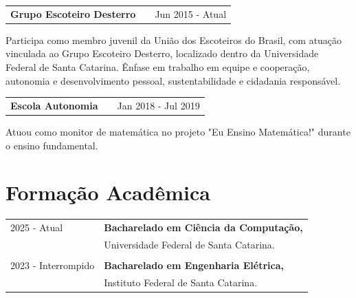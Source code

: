 \documentclass[a4paper,12pt]{article}
\makeatletter
\newenvironment{jobshort}[2]
    {
    \begin{tabularx}{\linewidth}{@{}l X r@{}}
    \textbf{#1} & \hfill &  #2 \\[3.75pt]
    \end{tabularx}
    }
    {
    }
\newenvironment{joblong}[2]
    {
    \begin{tabularx}{\linewidth}{@{}l X r@{}}
    \textbf{#1} & \hfill &  #2 \\[3.75pt]
    \end{tabularx}
    \begin{minipage}[t]{\linewidth}
    \begin{itemize}[nosep,after=\strut, leftmargin=1em, itemsep=3pt,label=--]
    }
    {
    \end{itemize}
    \end{minipage}    
    }
\makeatother
\begin{document}
\begin{jobshort}{Grupo Escoteiro Desterro}{Jun 2015 - Atual}
Participa como membro juvenil da União dos Escoteiros do Brasil, com atuação vinculada ao Grupo Escoteiro Desterro, localizado dentro da Universidade Federal de Santa Catarina. Ênfase em trabalho em equipe e cooperação, autonomia e desenvolvimento pessoal, sustentabilidade e cidadania responsável.
\end{jobshort}

\begin{jobshort}{Escola Autonomia}{Jan 2018 - Jul 2019}
Atuou como monitor de matemática no projeto "Eu Ensino Matemática!" durante o ensino fundamental.
\end{jobshort}

  


\section{Formação Acadêmica}
\begin{tabularx}{\linewidth}{@{}l X@{}}	
2025 - Atual & \textbf{Bacharelado em Ciência da Computação,} \\
&  Universidade Federal de Santa Catarina. \\
&\\
2023 - Interrompido & \textbf{Bacharelado em Engenharia Elétrica,} \\ 
& Instituto Federal de Santa Catarina. \\

\end{tabularx}
\end{document}
